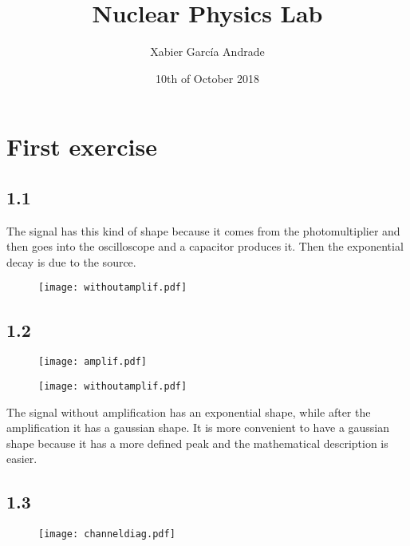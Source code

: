 \documentclass[a4paper,12pt]{article}
\title{Nuclear Physics Lab}
\author{Xabier García Andrade}
\date{10th of October 2018}
\begin{document}
\maketitle
\tableofcontents

\newpage

\section{First exercise}

\subsection{1.1}

The signal has this kind of shape because it comes from the photomultiplier and then goes into the oscilloscope and a capacitor produces it. Then the exponential decay is due to the source.

\begin{figure}[H]
\centering
\label{fig:without}
\texttt{[image: withoutamplif.pdf]}
\end{figure}


\subsection{1.2}


\begin{figure}[H]
\centering
\label{fig:with}
\texttt{[image: amplif.pdf]}
\end{figure}

\begin{figure}[H]
\centering
\label{fig:withouta}
\texttt{[image: withoutamplif.pdf]}
\end{figure}

The signal without amplification has an exponential shape, while after the amplification it has a gaussian shape. It is more convenient to have a gaussian shape because it has a more defined peak and the mathematical description is easier.

\subsection{1.3}

\begin{figure}[H]
\centering
\label{fig:withouta}
\texttt{[image: channeldiag.pdf]}
\end{figure}
\end{document}
